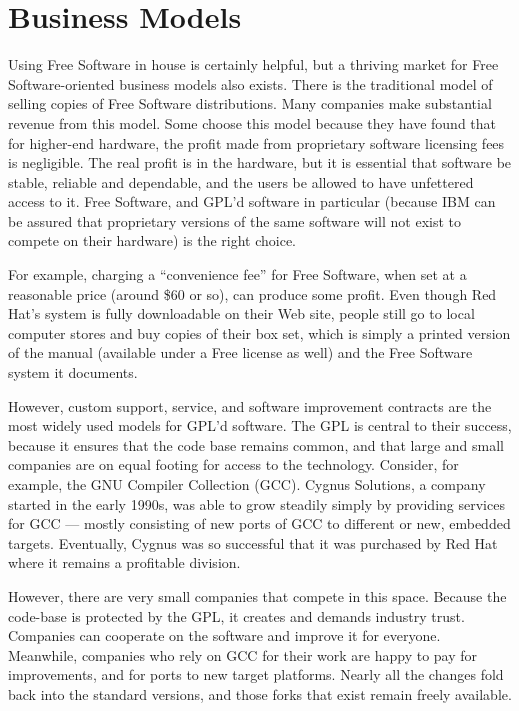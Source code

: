\section{Business Models}
\label{Business Models}

Using Free Software in house is certainly helpful, but a thriving
market for Free Software-oriented business models also exists. There is the
traditional model of selling copies of Free Software distributions.
Many companies make substantial revenue
from this model. Some choose this model because they have
found that for higher-end hardware, the profit made from proprietary
software licensing fees is negligible. The real profit is in the hardware,
but it is essential that software be stable, reliable and dependable, and
the users be allowed to have unfettered access to it. Free Software, and
GPL'd software in particular (because IBM can be assured that proprietary
versions of the same software will not exist to compete on their hardware)
is the right choice.

For example, charging a ``convenience fee'' for Free Software,
when set at a reasonable price (around \$60 or so), can produce some
profit. Even though Red Hat's system is fully downloadable on their
Web site, people still go to local computer stores and buy copies of their
box set, which is simply a printed version of the manual (available under
a Free license as well) and the Free Software system it documents.

\medskip

However, custom support, service, and software improvement contracts
are the most widely used models for GPL'd software. The GPL is
central to their success, because it ensures that the code base
remains common, and that large and small companies are on equal
footing for access to the technology. Consider, for example, the GNU
Compiler Collection (GCC). Cygnus Solutions, a company started in the
early 1990s, was able to grow steadily simply by providing services
for GCC --- mostly consisting of new ports of GCC to different or new,
embedded targets. Eventually, Cygnus was so successful that
it was purchased by Red Hat where it remains a profitable division.

However, there are very small companies that compete in
this space. Because the code-base is protected by the GPL, it creates and
demands industry trust. Companies can cooperate on the software and
improve it for everyone. Meanwhile, companies who rely on GCC for their
work are happy to pay for improvements, and for ports to new target
platforms. Nearly all the changes fold back into the standard
versions, and those forks that exist remain freely available.

